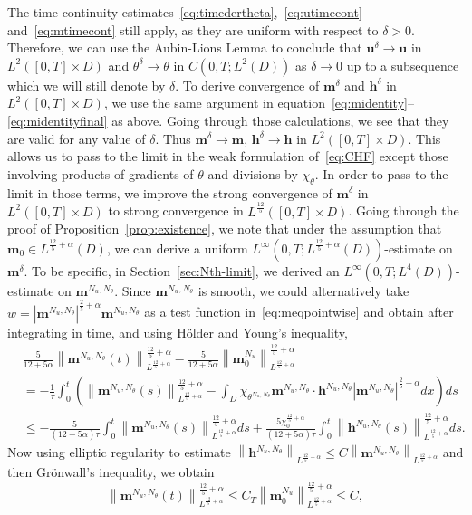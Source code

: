 \documentclass[10pt,letterpaper,twoside]{amsart}
\theoremstyle{definition}{\newtheorem{definition}[lemma]{Definition}}
\theoremstyle{note}{\newtheorem{claim}{Claim}[section]
\newtheorem*{claim*}{Claim}}
\numberwithin{equation}{section}
\newcommand{\dom}{D}
\newcommand{\norm}[1]{\left\| #1 \right\|}
\newcommand{\bu}{\mathbf{u}}
\newcommand{\bm}{\mathbf{m}}
\newcommand{\bmb}{\mathbf{m}^{N_u,N_\theta}}
\newcommand{\bhb}{\mathbf{h}^{N_u,N_\theta}}
\newcommand{\thb}{\theta^{N_u,N_\theta}}
\newcommand{\bmc}{\mathbf{m}^{N_u}}
\newcommand{\bh}{\mathbf{h}}
\newcommand{\bud}{\mathbf{u}^\delta}
\newcommand{\bmd}{\mathbf{m}^\delta}
\newcommand{\bhd}{\mathbf{h}^\delta}
\newcommand{\td}{\theta^\delta}
\begin{document}
 The time continuity estimates~\eqref{eq:timedertheta},~\eqref{eq:utimecont} and~\eqref{eq:mtimecont} still apply, as they are uniform with respect to $\delta>0$. Therefore, we can use the Aubin-Lions Lemma to conclude that $\bud\to \bu$ in $L^2([0,T]\times\dom)$ and $\td\to\theta$ in $C(0,T;L^2(\dom))$ as $\delta\to 0$ up to a subsequence which we will still denote by $\delta$. To derive convergence of $\bmd$ and $\bhd$ in $L^2([0,T]\times\dom)$, we use the same argument in equation~\eqref{eq:midentity}--\eqref{eq:midentityfinal} as above. Going through those calculations, we see that they are valid for any value of $\delta$.  Thus $\bmd\to \bm$, $\bhd\to \bh$ in $L^2([0,T]\times\dom)$.  This allows us to pass to the limit in the weak formulation of~\eqref{eq:CHF} except those involving products of gradients of $\theta$ and divisions by $\chi_\theta$. In order to pass to the limit in those terms, we improve the strong convergence of $\bmd$ in $L^2([0,T]\times\dom)$ to strong convergence in $L^{\frac{12}{5}}([0,T]\times\dom)$. Going through the proof of Proposition~\ref{prop:existence}, we note that under the assumption that $\bm_0\in L^{\frac{12}{5}+\alpha}(\dom)$, we can derive a uniform $L^\infty(0,T;L^{\frac{12}{5}+\alpha}(\dom))$-estimate on $\bm^{\delta}$. To be specific, in Section~\ref{sec:Nth-limit}, we derived an $L^\infty(0,T;L^4(\dom))$-estimate on $\bmb$. Since $\bmb$ is smooth, we could alternatively take $w=|\bmb|^{\frac{2}{5}+\alpha}\bmb$ as a test function in~\eqref{eq:meqpointwise} and obtain after integrating in time, and using H\"older and Young's inequality,
 \begin{align*}
 	&\frac{5}{12+5\alpha}\norm{\bmb(t)}_{L^{\frac{12}{5}+\alpha}}^{\frac{12}{5}+\alpha}-\frac{5}{12+5\alpha}\norm{\bmc_0}_{L^{\frac{12}{5}+\alpha}}^{\frac{12}{5}+\alpha}\\
 	& =-\frac{1}{\tau}\int_0^t\left( \norm{\bmb(s)}_{L^{\frac{12}{5}+\alpha}}^{\frac{12}{5}+\alpha}-\int_{\dom}\chi_{\thb}\bmb\cdot\bhb |\bmb|^{\frac{2}{5}+\alpha} dx \right)ds\\
 	 & \leq -\frac{5}{(12+5\alpha)\tau}\int_0^t\norm{\bmb(s)}_{L^{\frac{12}{5}+\alpha}}^{\frac{12}{5}+\alpha}ds +\frac{5\chi_0^{\frac{12}{5}+\alpha}}{(12+5\alpha)\tau}\int_0^t \norm{\bhb(s)}_{L^{\frac{12}{5}+\alpha}}^{\frac{12}{5}+\alpha}ds.
 \end{align*} 
 Now using elliptic regularity to estimate $\norm{\bhb}_{L^{\frac{12}{5}+\alpha}}\leq C \norm{\bmb}_{L^{\frac{12}{5}+\alpha}}$ and then Gr\"onwall's inequality, we obtain
 \begin{equation*}
 	\norm{\bmb(t)}_{L^{\frac{12}{5}+\alpha}}^{\frac{12}{5}+\alpha}\leq C_T \norm{\bm_0^{N_u}}_{L^{\frac{12}{5}+\alpha}}^{\frac{12}{5}+\alpha}\leq C,
 \end{equation*}
\end{document}

